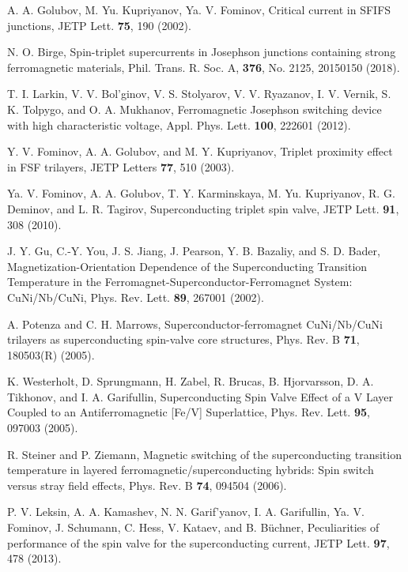 \documentclass[prb,amsmath,amssymb,reprint]{revtex4-2}
\begin{document}
\begin{thebibliography}{99}
A. A. Golubov, M. Yu. Kupriyanov, Ya. V. Fominov,  Critical current in SFIFS junctions, JETP Lett. \textbf{75},
 190 (2002).

 N. O. Birge,
Spin-triplet supercurrents in Josephson junctions containing strong ferromagnetic materials,
Phil. Trans. R. Soc. A, \textbf{376}, No. 2125, 20150150 (2018).

 T. I. Larkin, V. V. Bol'ginov, V. S. Stolyarov, V. V.
Ryazanov, I. V. Vernik, S. K. Tolpygo, and O. A. Mukhanov,
Ferromagnetic Josephson switching device with high characteristic voltage,
Appl. Phys. Lett. \textbf{100}, 222601 (2012).

Y. V. Fominov, A. A. Golubov, and  M. Y. Kupriyanov, Triplet proximity effect in FSF trilayers, JETP Letters \textbf{77},
 510 (2003).

 Ya. V. Fominov, A. A. Golubov, T. Y. Karminskaya, M.
Yu. Kupriyanov, R. G. Deminov, and L. R. Tagirov,
Superconducting triplet spin valve,
JETP Lett. \textbf{91},
308 (2010).

 J. Y. Gu, C.-Y. You, J. S. Jiang, J. Pearson, Y. B. Bazaliy, and S. D. Bader,
Magnetization-Orientation Dependence of the Superconducting Transition Temperature in the Ferromagnet-Superconductor-Ferromagnet System: CuNi/Nb/CuNi,
Phys. Rev. Lett. \textbf{89}, 267001 (2002).

 A. Potenza and C. H. Marrows, Superconductor-ferromagnet CuNi/Nb/CuNi trilayers as superconducting spin-valve core structures,
Phys. Rev. B \textbf{71}, 180503(R) (2005).

 K. Westerholt, D. Sprungmann, H. Zabel, R. Brucas,
B. Hjorvarsson, D. A. Tikhonov, and I. A. Garifullin,
Superconducting Spin Valve Effect of a V Layer Coupled to an Antiferromagnetic [Fe/V] Superlattice,
Phys. Rev. Lett.
\textbf{95}, 097003 (2005).

 R. Steiner and P. Ziemann, Magnetic switching of the superconducting transition temperature in layered ferromagnetic/superconducting hybrids: Spin switch versus stray field effects,
Phys. Rev. B \textbf{74}, 094504 (2006).

 P. V. Leksin, A. A. Kamashev, N. N. Garif'yanov, I.
A. Garifullin, Ya. V. Fominov, J. Schumann, C. Hess, V. Kataev, and B. B\"{u}chner, Peculiarities of performance of the spin valve for the superconducting current,
JETP Lett. \textbf{97}, 478 (2013).


\end{thebibliography}
\end{document}
